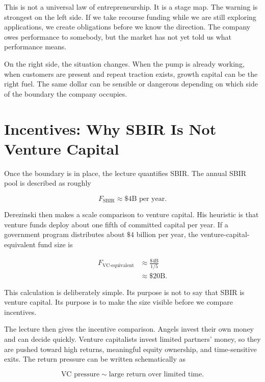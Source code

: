 This is not a universal law of entrepreneurship. It is a stage map. The warning is strongest on the left side. If we take recourse funding while we are still exploring applications, we create obligations before we know the direction. The company owes performance to somebody, but the market has not yet told us what performance means.

On the right side, the situation changes. When the pump is already working, when customers are present and repeat traction exists, growth capital can be the right fuel. The same dollar can be sensible or dangerous depending on which side of the boundary the company occupies.

\section{Incentives: Why SBIR Is Not Venture Capital}

Once the boundary is in place, the lecture quantifies SBIR. The annual SBIR pool is described as roughly

\begin{equation}
F_{\text{SBIR}}\approx \$4\text{B per year}.
\end{equation}

Derezinski then makes a scale comparison to venture capital. His heuristic is that venture funds deploy about one fifth of committed capital per year. If a government program distributes about \(\$4\) billion per year, the venture-capital-equivalent fund size is

\begin{align}
F_{\text{VC-equivalent}}
&\approx \frac{\$4\text{B}}{1/5}\\
&\approx \$20\text{B}.
\end{align}

This calculation is deliberately simple. Its purpose is not to say that SBIR is venture capital. Its purpose is to make the size visible before we compare incentives.

The lecture then gives the incentive comparison. Angels invest their own money and can decide quickly. Venture capitalists invest limited partners' money, so they are pushed toward high returns, meaningful equity ownership, and time-sensitive exits. The return pressure can be written schematically as

\begin{equation}
\text{VC pressure}
\sim
\text{large return over limited time}.
\end{equation}

